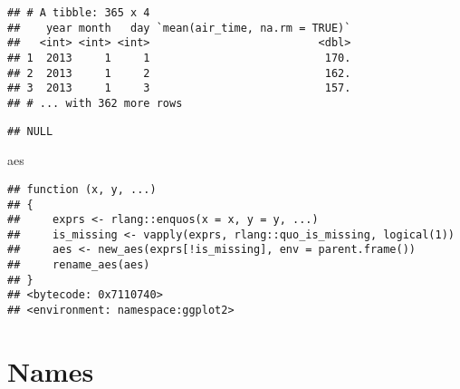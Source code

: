 \documentclass[]{book}
\newenvironment{Shaded}{\begin{snugshade}}{\end{snugshade}}
\newcommand{\DataTypeTok}[1]{\textcolor[rgb]{0.13,0.29,0.53}{#1}}
\newcommand{\KeywordTok}[1]{\textcolor[rgb]{0.13,0.29,0.53}{\textbf{#1}}}
\newcommand{\NormalTok}[1]{#1}
\newcommand{\OperatorTok}[1]{\textcolor[rgb]{0.81,0.36,0.00}{\textbf{#1}}}
\newcommand{\OtherTok}[1]{\textcolor[rgb]{0.56,0.35,0.01}{#1}}
\newcommand{\StringTok}[1]{\textcolor[rgb]{0.31,0.60,0.02}{#1}}
\begin{document}
\begin{Shaded}
\end{Shaded}

\begin{verbatim}
## # A tibble: 365 x 4
##    year month   day `mean(air_time, na.rm = TRUE)`
##   <int> <int> <int>                          <dbl>
## 1  2013     1     1                           170.
## 2  2013     1     2                           162.
## 3  2013     1     3                           157.
## # ... with 362 more rows
\end{verbatim}

\begin{Shaded}
\end{Shaded}

\begin{verbatim}
## NULL
\end{verbatim}

\begin{Shaded}
\begin{Highlighting}[]
\NormalTok{aes}
\end{Highlighting}
\end{Shaded}

\begin{verbatim}
## function (x, y, ...) 
## {
##     exprs <- rlang::enquos(x = x, y = y, ...)
##     is_missing <- vapply(exprs, rlang::quo_is_missing, logical(1))
##     aes <- new_aes(exprs[!is_missing], env = parent.frame())
##     rename_aes(aes)
## }
## <bytecode: 0x7110740>
## <environment: namespace:ggplot2>
\end{verbatim}

\hypertarget{names-1}{%
\section{Names}\label{names-1}}
\end{document}
